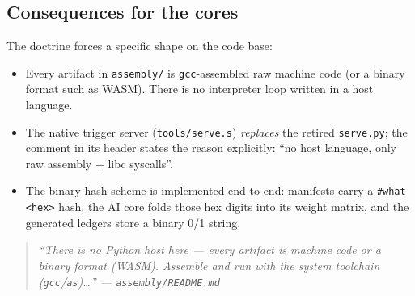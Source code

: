 \subsection{Consequences for the cores}

The doctrine forces a specific shape on the code base:

\begin{itemize}
  \item Every artifact in \texttt{assembly/} is \texttt{gcc}-assembled raw
    machine code (or a binary format such as WASM).  There is no interpreter
    loop written in a host language.
  \item The native trigger server (\texttt{tools/serve.s}) \emph{replaces}
    the retired \texttt{serve.py}; the comment in its header states the
    reason explicitly: ``no host language, only raw assembly + libc
    syscalls''.
  \item The binary-hash scheme is implemented end-to-end: manifests carry a
    \texttt{\#what <hex>} hash, the AI core folds those hex digits into its
    weight matrix, and the generated ledgers store a binary 0/1 string.
\end{itemize}

\begin{quote}\itshape
  ``There is no Python host here --- every artifact is machine code or a
  binary format (WASM).  Assemble and run with the system toolchain
  (\texttt{gcc}/\texttt{as})\ldots'' \hfill --- \texttt{assembly/README.md}
\end{quote}

